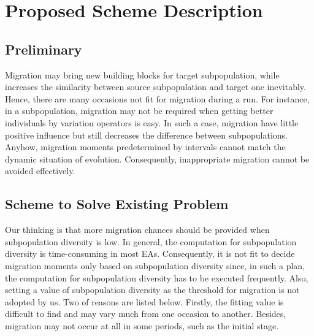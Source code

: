 \documentclass[journal,onecolumn]{IEEEtran}
\begin{document}
\section{Proposed Scheme Description}
\subsection{Preliminary}
Migration may bring new building blocks for target subpopulation, while increases the similarity between source subpopulation and target one inevitably.
Hence, there are many occasions not fit for migration during a run.
For instance, in a subpopulation, migration may not be required when getting better individuals by variation operators is easy.
In such a case, migration have little positive influence but still decreases the difference between subpopulations.
Anyhow, migration moments predetermined by intervals cannot match the dynamic situation of evolution.
Consequently, inappropriate migration cannot be avoided effectively.
\subsection{Scheme to Solve Existing Problem}
%
Our thinking is that more migration chances should be provided when subpopulation diversity is low.
In general, the computation for subpopulation diversity is time-consuming in most EAs.
Consequently, it is not fit to decide migration moments only based on subpopulation diversity since, in such a plan, the computation for subpopulation diversity has to be executed frequently.
Also, setting a value of subpopulation diversity as the threshold for migration is not adopted by us.
Two of reasons are listed below.
Firstly, the fitting value is difficult to find and may vary much from one occasion to another.
Besides, migration may not occur at all in some periods, such as the initial stage.
\end{document}
